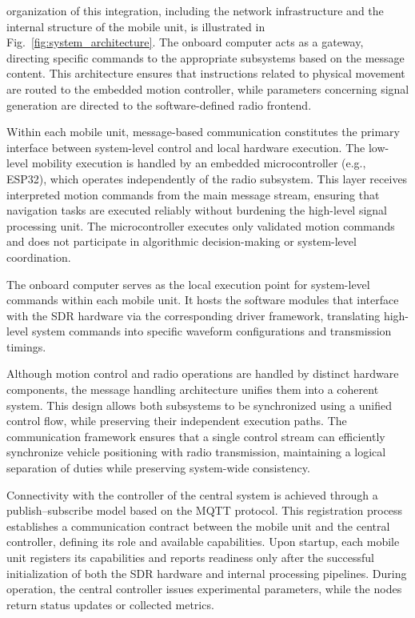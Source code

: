 \documentclass[conference,a4paper]{IEEEtran}
\begin{document}
organization of this integration, including the network
infrastructure and the internal structure of the mobile unit, is illustrated
in Fig.~\ref{fig:system_architecture}.
The onboard computer acts as a gateway, directing specific commands to the appropriate subsystems based on the message content. This architecture ensures that instructions related to physical movement are routed to the embedded motion controller, while parameters concerning signal generation are directed to the software-defined radio frontend.





Within each mobile unit, message-based communication constitutes the primary interface between system-level control and local hardware execution. The low-level mobility execution is handled by an embedded microcontroller (e.g., ESP32), which operates independently of the radio subsystem. This layer receives interpreted motion commands from the main message stream, ensuring that navigation tasks are executed reliably without burdening the high-level signal processing unit. The microcontroller executes only validated motion commands and does not participate in algorithmic decision-making or system-level coordination.

The onboard computer serves as the local execution point for system-level commands within each mobile unit. It hosts the software modules that interface with the SDR hardware via the corresponding driver framework, translating high-level system commands into specific waveform configurations and transmission timings.

Although motion control and radio operations are handled by distinct hardware components, the message handling architecture unifies them into a coherent system. This design allows both subsystems to be synchronized using a unified control flow, while preserving their independent execution paths. The communication framework ensures that a single control stream can efficiently synchronize vehicle positioning with radio transmission, maintaining a logical separation of duties while preserving system-wide consistency.

Connectivity with the controller of the central system is achieved through a publish–subscribe model based on the MQTT protocol. This registration process establishes a communication contract between the mobile unit and the central controller, defining its role and available capabilities. Upon startup, each mobile unit registers its capabilities and reports readiness only after the successful initialization of both the SDR hardware and internal processing pipelines. During operation, the central controller issues experimental parameters, while the nodes return status updates or collected metrics.
\end{document}
